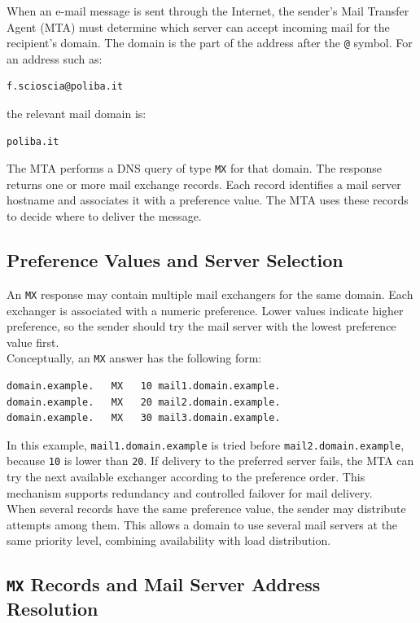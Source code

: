 \documentclass{scrbook}
\begin{document}
	When an e-mail message is sent through the Internet, the sender's Mail Transfer Agent (MTA) must determine which server can accept incoming mail for the recipient's domain. The domain is the part of the address after the \texttt{@} symbol. For an address such as:
	\begin{lstlisting}
f.scioscia@poliba.it
	\end{lstlisting}
	the relevant mail domain is:
	\begin{lstlisting}
poliba.it
	\end{lstlisting}
	
	The MTA performs a DNS query of type \texttt{MX} for that domain. The response returns one or more mail exchange records. Each record identifies a mail server hostname and associates it with a preference value. The MTA uses these records to decide where to deliver the message.
	
	\subsection{Preference Values and Server Selection}
	
	An \texttt{MX} response may contain multiple mail exchangers for the same domain. Each exchanger is associated with a numeric preference. Lower values indicate higher preference, so the sender should try the mail server with the lowest preference value first.\\
	
	Conceptually, an \texttt{MX} answer has the following form:
	\begin{lstlisting}
domain.example.   MX   10 mail1.domain.example.
domain.example.   MX   20 mail2.domain.example.
domain.example.   MX   30 mail3.domain.example.
	\end{lstlisting}
	
	In this example, \texttt{mail1.domain.example} is tried before \texttt{mail2.domain.example}, because \texttt{10} is lower than \texttt{20}. If delivery to the preferred server fails, the MTA can try the next available exchanger according to the preference order. This mechanism supports redundancy and controlled failover for mail delivery.\\
	
	When several records have the same preference value, the sender may distribute attempts among them. This allows a domain to use several mail servers at the same priority level, combining availability with load distribution.
	
	\subsection{\texttt{MX} Records and Mail Server Address Resolution}
	
\end{document}
